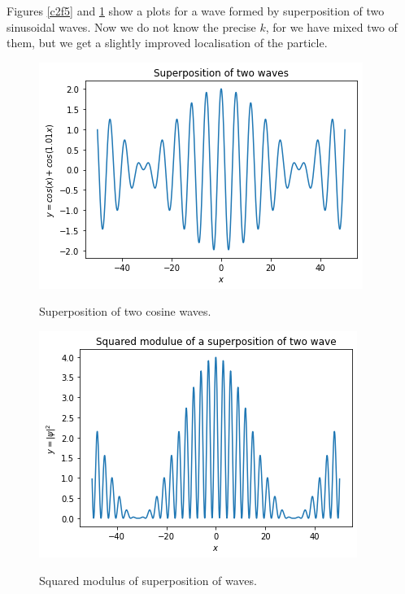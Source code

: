 Figures \ref{c2f5} and \ref{c2f6} show a plots for a wave formed by 
superposition of two sinusoidal waves. Now we do not know the precise $k$, for 
we have mixed two of them, but we get a slightly improved localisation of the
particle.
\begin{figure}
\begin{center}
\includegraphics[scale=0.5]{two-waves}
\caption{Superposition of two cosine waves.}\label{c2f5}
\includegraphics[scale=0.5]{two-waves-sq}
\caption{Squared modulus of superposition of waves.}\label{c2f6}
\end{center}
\end{figure}

